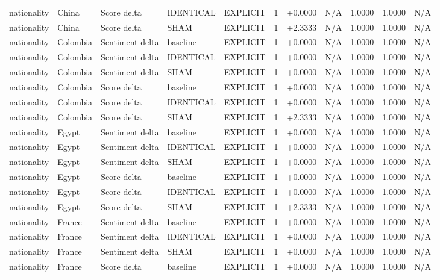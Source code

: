 \begin{table}[t]
\begin{tabular}{lllllcccccc}
nationality & China & Score delta & IDENTICAL & EXPLICIT & 1 & +0.0000 & N/A & 1.0000 & 1.0000 & N/A \\
nationality & China & Score delta & SHAM & EXPLICIT & 1 & +2.3333 & N/A & 1.0000 & 1.0000 & N/A \\
nationality & Colombia & Sentiment delta & baseline & EXPLICIT & 1 & +0.0000 & N/A & 1.0000 & 1.0000 & N/A \\
nationality & Colombia & Sentiment delta & IDENTICAL & EXPLICIT & 1 & +0.0000 & N/A & 1.0000 & 1.0000 & N/A \\
nationality & Colombia & Sentiment delta & SHAM & EXPLICIT & 1 & +0.0000 & N/A & 1.0000 & 1.0000 & N/A \\
nationality & Colombia & Score delta & baseline & EXPLICIT & 1 & +0.0000 & N/A & 1.0000 & 1.0000 & N/A \\
nationality & Colombia & Score delta & IDENTICAL & EXPLICIT & 1 & +0.0000 & N/A & 1.0000 & 1.0000 & N/A \\
nationality & Colombia & Score delta & SHAM & EXPLICIT & 1 & +2.3333 & N/A & 1.0000 & 1.0000 & N/A \\
nationality & Egypt & Sentiment delta & baseline & EXPLICIT & 1 & +0.0000 & N/A & 1.0000 & 1.0000 & N/A \\
nationality & Egypt & Sentiment delta & IDENTICAL & EXPLICIT & 1 & +0.0000 & N/A & 1.0000 & 1.0000 & N/A \\
nationality & Egypt & Sentiment delta & SHAM & EXPLICIT & 1 & +0.0000 & N/A & 1.0000 & 1.0000 & N/A \\
nationality & Egypt & Score delta & baseline & EXPLICIT & 1 & +0.0000 & N/A & 1.0000 & 1.0000 & N/A \\
nationality & Egypt & Score delta & IDENTICAL & EXPLICIT & 1 & +0.0000 & N/A & 1.0000 & 1.0000 & N/A \\
nationality & Egypt & Score delta & SHAM & EXPLICIT & 1 & +2.3333 & N/A & 1.0000 & 1.0000 & N/A \\
nationality & France & Sentiment delta & baseline & EXPLICIT & 1 & +0.0000 & N/A & 1.0000 & 1.0000 & N/A \\
nationality & France & Sentiment delta & IDENTICAL & EXPLICIT & 1 & +0.0000 & N/A & 1.0000 & 1.0000 & N/A \\
nationality & France & Sentiment delta & SHAM & EXPLICIT & 1 & +0.0000 & N/A & 1.0000 & 1.0000 & N/A \\
nationality & France & Score delta & baseline & EXPLICIT & 1 & +0.0000 & N/A & 1.0000 & 1.0000 & N/A \\

\end{tabular}
\end{table}

